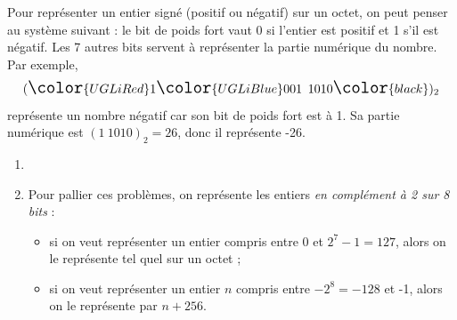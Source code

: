 \begin{exercice}
    Pour représenter un entier signé (positif ou négatif) sur un octet, on peut penser au système suivant : le bit de poids fort vaut 0 si l'entier est positif et 1 s'il est négatif. Les 7 autres bits servent à représenter la partie numérique du nombre.\\
    Par exemple, $$\Large(\color{UGLiRed}1\color{UGLiBlue}001\ 1010\color{black})_2$$
    représente un nombre négatif car son bit de poids fort est à 1. Sa partie numérique est $(1\ 1010)_2=26$, donc il représente -26.
    \begin{enumerate}
        \item 	{}
        \item 	Pour pallier ces problèmes, on représente les entiers \textit{en complément à 2 sur 8 bits} :
              \begin{itemize}
                  \item si on veut représenter un entier compris entre 0 et $2^7-1=127$, alors on le représente tel quel sur un octet ;
                  \item si on veut représenter un entier $n$ compris entre $-2^8=-128$ et -1, alors on le représente par $n+256$.
              \end{itemize}
              \begin{center}
\end{center}
\end{enumerate}
\end{exercice}
